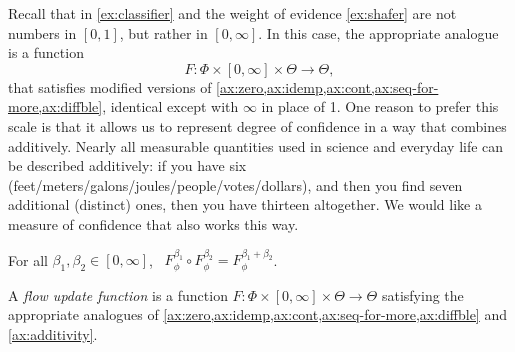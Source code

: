 



Recall that in \cref{ex:classifier} and the weight of evidence 
\cref{ex:shafer} are not numbers in $[0,1]$,
but rather in $[0,\infty]$. 
In this case, the appropriate analogue is a function
\begin{equation}
	F : \Phi \times [0, \infty] \times \Theta \to \Theta,
	\label{eq:zero-inf-form}
\end{equation}
that satisfies modified versions of \cref{ax:zero,ax:idemp,ax:cont,ax:seq-for-more,ax:diffble}, identical except with $\infty$ in place of 1. 
One reason to prefer this scale is that it 
allows us to represent degree of confidence in a way that combines additively. 
Nearly all measurable quantities used in science 
and everyday life can be described additively:
if you have six (feet/meters/galons/joules/people/votes/dollars), 
and then you find seven additional (distinct) ones, then you have thirteen altogether. 
We would like a measure of confidence that also works this way.

\begin{CFaxioms}
	\item For all
		$\beta_1, \beta_2 \in [0,\infty]$,~
		$F^{\beta_1}_\phi \circ F^{\beta_2}_\phi = F^{\beta_1 + \beta_2}_\phi$.
		\label{ax:additivity}
\end{CFaxioms}


\begin{defn}
	A \emph{flow update function}
	is a function
	$F : \Phi \times[0,\infty] \times \Theta\to \Theta$
	satisfying the appropriate analogues of
	\cref{ax:zero,ax:idemp,ax:cont,ax:seq-for-more,ax:diffble}
	and \cref{ax:additivity}.
\end{defn}


